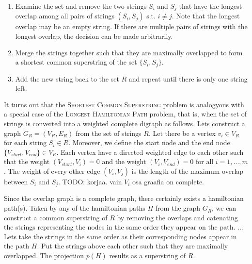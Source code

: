 \documentclass[english,twoside,censored,csm,algorithms-track-2020]{HYthesisML}
\theoremstyle{plain}
\theoremstyle{definition}
\begin{document}
\begin{enumerate}
\item Examine the set and remove the two strings $S_i$ and $S_j$ that have the longest overlap among all pairs of strings $(S_i, S_j)$ s.t. $i\neq j$. Note that the longest overlap may be an empty string. If there are multiple pairs of strings with the longest overlap, the decision can be made arbitrarily.
\item Merge the strings together such that they are maximally overlapped to form a shortest common superstring of the set $\{S_i, S_j\}$.
  \item Add the new string back to the set $R$ and repeat until there is only one string left.
\end{enumerate}

It turns out that the \textsc{Shortest Common Superstring} problem is analogyous with a special case of
the \textsc{Longest Hamiltonian Path} problem, that is, when the set of strings is converted into
a weighted complete digraph as follows. Lets construct a graph $G_R=(V_R,E_R)$ from the set of strings $R$.
Let there be a vertex $v_i\in V_R$ for each string $S_i\in R$. Moreover, we define the start node and
the end node $\{V_{start},V_{end}\}\in V_R$. Each vertex have a directed weighted edge to each other
such that the weight $(V_{start}, V_i) = 0$ and the weight $(V_i, V_{end}) = 0$ for all $i=1,...,m$.
The weight of every other edge $(V_i, V_j)$ is the length of the maximum overlap between $S_i$ and $S_j$.
TODO: korjaa. vain $V_i$ osa graafia on complete.







Since the overlap graph is a complete graph, there certainly exists a hamiltonian path(s). Taken by any
of the hamiltonian paths $H$ from the graph $G_R$, we can construct a common superstring of $R$ by
removing the overlaps and catenating the strings representing the nodes in the same order they appear
on the path.
...
Lets take the strings in the same order as their corresponding nodes appear in the path $H$. Put the
strings above each other such that they are maximally overlapped. The projection $p(H)$ results as a
superstring of $R$.
\end{document}

